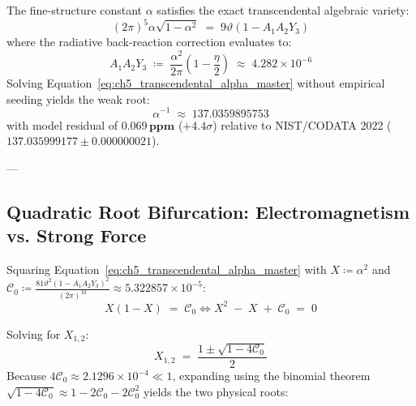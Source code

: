 \documentclass[
    12pt,
    a4paper,
    headings=normal,
    twoside=false,
    open=any,
    parskip=half
]{scrbook}
\begin{document}
\begin{phystheorem}\label{thm:ch5_transcendental_alpha_master}
The fine-structure constant $\alpha$ satisfies the exact transcendental algebraic variety:
\begin{equation}
\boxed{(2\pi)^5 \alpha \sqrt{1 - \alpha^2} \;=\; 9\vartheta \left( 1 - A_1 A_2 Y_3 \right)}
\label{eq:ch5_transcendental_alpha_master}
\end{equation}
where the radiative back-reaction correction evaluates to:
\begin{equation}
A_1 A_2 Y_3 \;\coloneqq\; \frac{\alpha^2}{2\pi} \left( 1 - \frac{\eta}{2} \right) \;\approx\; 4.282 \times 10^{-6}
\label{eq:ch5_radiative_correction}
\end{equation}
Solving Equation~\eqref{eq:ch5_transcendental_alpha_master} without empirical seeding yields the weak root:
\begin{equation}
\boxed{\alpha^{-1} \;\approx\; \mathbf{137.0359895753}}
\label{eq:ch5_alpha_inv_result}
\end{equation}
with model residual of $\mathbf{0.069\,\text{ppm}}$ ($+4.4\sigma$) relative to NIST/CODATA 2022 ($137.035999177 \pm 0.000000021$).
\end{phystheorem}

---

\subsection{Quadratic Root Bifurcation: Electromagnetism vs. Strong Force}

Squaring Equation~\eqref{eq:ch5_transcendental_alpha_master} with $X \coloneqq \alpha^2$ and $\mathcal{C}_0 \coloneqq \frac{81\vartheta^2(1 - A_1 A_2 Y_3)^2}{(2\pi)^{10}} \approx 5.322857 \times 10^{-5}$:
\begin{equation}
X(1 - X) \;=\; \mathcal{C}_0 \iff \boxed{X^2 \;-\; X \;+\; \mathcal{C}_0 \;=\; 0}
\label{eq:ch5_quadratic_equation_X}
\end{equation}

Solving for $X_{1, 2}$:
\begin{equation}
X_{1, 2} \;=\; \frac{1 \pm \sqrt{1 - 4\mathcal{C}_0}}{2}
\end{equation}
Because $4\mathcal{C}_0 \approx 2.1296 \times 10^{-4} \ll 1$, expanding using the binomial theorem $\sqrt{1 - 4\mathcal{C}_0} \approx 1 - 2\mathcal{C}_0 - 2\mathcal{C}_0^2$ yields the two physical roots:
\end{document}
